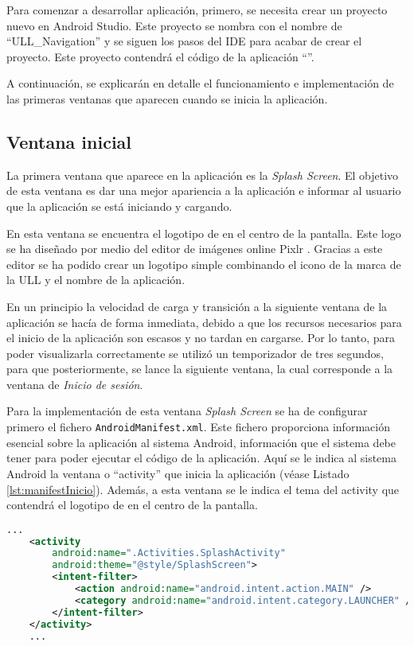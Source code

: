 Para comenzar a desarrollar aplicación, primero, se necesita crear un proyecto nuevo en Android Studio. Este proyecto se nombra con el nombre de ``ULL\_Navigation'' y se siguen los pasos del IDE para acabar de crear el proyecto. Este proyecto contendrá el código de la aplicación ``\ULLAR{}''.  

A continuación, se explicarán en detalle el funcionamiento e implementación de las primeras ventanas que aparecen cuando se inicia la aplicación. 

\subsection{Ventana inicial}

La primera ventana que aparece en la aplicación es la \textit{Splash Screen}. El objetivo de esta ventana es dar una mejor apariencia a la aplicación e informar al usuario que la aplicación se está iniciando y cargando. 

En esta ventana se encuentra el logotipo de \ULLAR{} en el centro de la pantalla. Este logo se ha diseñado por medio del editor de imágenes online Pixlr \cite{URL::pixlr}. Gracias a este editor se ha podido crear un logotipo simple combinando el icono de la marca de la ULL y el nombre de la aplicación.
    

En un principio la velocidad de carga y transición a la siguiente ventana de la aplicación se hacía de forma inmediata, debido a que los recursos necesarios para el inicio de la aplicación son escasos y no tardan en cargarse. Por lo tanto, para poder visualizarla correctamente se utilizó un temporizador de tres segundos, para que posteriormente, se lance la siguiente ventana, la cual corresponde a la ventana de \textit{Inicio de sesión}.

Para la implementación de esta ventana \textit{Splash Screen} se ha de configurar primero el fichero \texttt{AndroidManifest.xml}. Este fichero proporciona información esencial sobre la aplicación al sistema Android, información que el sistema debe tener para poder ejecutar el código de la aplicación. Aquí se le indica al sistema Android la ventana o ``activity'' \cite{URL::activity} que inicia la aplicación (véase Listado \ref{lst:manifestInicio}). Además, a esta ventana se le indica el tema del activity que contendrá el logotipo de \ULLAR{} en el centro de la pantalla.

\begin{lstlisting}[language=XML,caption={Fichero \texttt{AndroidManifest.xml}, activity que inicia la aplicación.}, label={lst:manifestInicio}]
    ...
    <activity
        android:name=".Activities.SplashActivity"
        android:theme="@style/SplashScreen">
        <intent-filter> 
            <action android:name="android.intent.action.MAIN" />
            <category android:name="android.intent.category.LAUNCHER" />
        </intent-filter>
    </activity>
    ...
\end{lstlisting}

